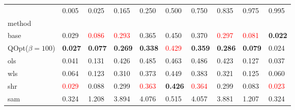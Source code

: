 \begin{tabular}{llllllllll}
\toprule
 & 0.005 & 0.025 & 0.165 & 0.250 & 0.500 & 0.750 & 0.835 & 0.975 & 0.995 \\
method &  &  &  &  &  &  &  &  &  \\
\midrule
base & 0.029 & \textcolor{red}{0.086} & \textcolor{red}{0.293} & 0.365 & 0.450 & 0.370 & \textcolor{red}{0.297} & \textcolor{red}{0.081} & \textbf{0.022} \\
\midrule
QOpt($\beta=100$) & \textbf{0.027} & \textbf{0.077} & \textbf{0.269} & \textbf{0.338} & \textcolor{red}{0.429} & \textbf{0.359} & \textbf{0.286} & \textbf{0.079} & 0.024 \\
ols & 0.041 & 0.131 & 0.426 & 0.485 & 0.463 & 0.486 & 0.423 & 0.127 & 0.037 \\
wls & 0.064 & 0.123 & 0.310 & 0.373 & 0.449 & 0.383 & 0.321 & 0.125 & 0.060 \\
shr & \textcolor{red}{0.029} & 0.088 & 0.299 & \textcolor{red}{0.363} & \textbf{0.426} & \textcolor{red}{0.364} & 0.299 & 0.083 & \textcolor{red}{0.023} \\
sam & 0.324 & 1.208 & 3.894 & 4.076 & 0.515 & 4.057 & 3.881 & 1.207 & 0.324 \\
\bottomrule
\end{tabular}